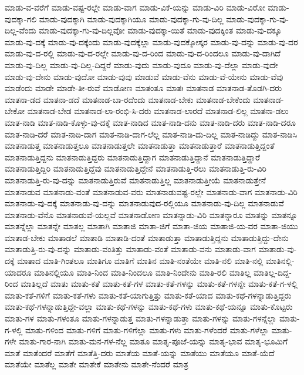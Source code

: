 ಮಾಡು-ವ-ವರೆಗೆ
ಮಾಡು-ವಷ್ಟ-ರಲ್ಲೇ
ಮಾಡು-ವಾಗ
ಮಾಡು-ವಿಕೆ-ಯನ್ನು
ಮಾಡು-ವಿರಿ
ಮಾಡು-ವಿರೋ
ಮಾಡು-ವುದಕ್ಕಾ-ಗಲಿ
ಮಾಡು-ವುದಕ್ಕಾಗಿ
ಮಾಡು-ವುದಕ್ಕಾಗಿಯೂ
ಮಾಡು-ವುದಕ್ಕಾ-ಗು-ವು-ದಿಲ್ಲ
ಮಾಡು-ವುದಕ್ಕಾ-ಗು-ವು-ದಿಲ್ಲ-ವೆಂದು
ಮಾಡು-ವುದಕ್ಕಾ-ಗು-ವು-ದಿಲ್ಲವೋ
ಮಾಡು-ವುದಕ್ಕಾ-ಯಿತೆ
ಮಾಡು-ವುದಕ್ಕಿಂತ
ಮಾಡು-ವು-ದಕ್ಕೂ
ಮಾಡು-ವು-ದಕ್ಕೆ
ಮಾಡು-ವು-ದಕ್ಕೆಂದು
ಮಾಡು-ವುದಕ್ಕೆಲ್ಲಾ
ಮಾಡು-ವುದಕ್ಕೋಸ್ಕರ
ಮಾಡು-ವು-ದನ್ನು
ಮಾಡು-ವು-ದರ
ಮಾಡು-ವು-ದ-ರಲ್ಲಿ
ಮಾಡು-ವು-ದ-ರಲ್ಲೇ
ಮಾಡು-ವು-ದ-ರಿಂದ
ಮಾಡು-ವು-ದ-ರಿಂದಲೂ
ಮಾಡು-ವು-ದಾಗಿದೆ
ಮಾಡು-ವು-ದಿಲ್ಲ
ಮಾಡು-ವು-ದಿಲ್ಲ-ದಿದ್ದರೆ
ಮಾಡು-ವುದು
ಮಾಡು-ವುದೂ
ಮಾಡು-ವು-ದೆಲ್ಲಾ
ಮಾಡು-ವುದೇ
ಮಾಡು-ವು-ದೇನು
ಮಾಡು-ವುದೋ
ಮಾಡು-ವುವು
ಮಾಡುವೆ
ಮಾಡು-ವೆನು
ಮಾಡು-ವೆ-ಯೇನು
ಮಾಡು-ವೆವು
ಮಾಡೆಂದು
ಮಾಡೇ
ಮಾಡೇ-ತೀ-ರುವೆ
ಮಾಡೋಣ
ಮಾತಂತೂ
ಮಾತಃ
ಮಾತನಾಡ
ಮಾತನಾಡ-ತೊಡಗಿ-ದರು
ಮಾತನಾ-ಡದ
ಮಾತನಾ-ಡದೆ
ಮಾತನಾಡ-ಬಾ-ರದೆಂದು
ಮಾತನಾಡ-ಬೇಕು
ಮಾತನಾಡ-ಬೇಕೆಂದು
ಮಾತನಾಡ-ಬೇಕೋ
ಮಾತನಾಡ-ಬೇಡ
ಮಾತನಾಡ-ಲಾ-ರಂಭಿ-ಸಿ-ದರು
ಮಾತನಾಡ-ಲಾರದೆ
ಮಾತನಾಡ-ಲಿಲ್ಲ
ಮಾತನಾ-ಡಲು
ಮಾತ-ನಾಡಿ
ಮಾತ-ನಾಡಿ-ಕೊಳ್ಳು-ವು-ದಕ್ಕೆ
ಮಾತ-ನಾಡಿದ
ಮಾತ-ನಾಡಿ-ದನು
ಮಾತ-ನಾಡಿ-ದರು
ಮಾತ-ನಾಡಿ-ದರೂ
ಮಾತ-ನಾಡಿ-ದರೆ
ಮಾತ-ನಾಡಿ-ದಾಗ
ಮಾತ-ನಾಡಿ-ದಾಗ-ಲೆಲ್ಲ
ಮಾತ-ನಾಡಿ-ದು-ದಿಲ್ಲ
ಮಾತ-ನಾಡಿದ್ದು
ಮಾತ-ನಾಡಿಸಿ
ಮಾತನಾಡುತ್ತ
ಮಾತನಾಡುತ್ತಲೂ
ಮಾತನಾಡುತ್ತಲೇ
ಮಾತನಾಡುತ್ತಾ
ಮಾತನಾಡುತ್ತಾರೆ
ಮಾತನಾಡುತ್ತಿದ್ದಂತೆ
ಮಾತನಾಡುತ್ತಿದ್ದನು
ಮಾತನಾಡುತ್ತಿದ್ದರು
ಮಾತನಾಡುತ್ತಿದ್ದಾಗ
ಮಾತನಾಡುತ್ತಿದ್ದಾನೆ
ಮಾತನಾಡುತ್ತಿದ್ದಾರೆ
ಮಾತನಾಡುತ್ತಿದ್ದಿರಿ
ಮಾತನಾಡುತ್ತಿದ್ದೆವು
ಮಾತನಾಡುತ್ತಿದ್ದೇನೆ
ಮಾತನಾಡುತ್ತಿ-ರಲು
ಮಾತನಾಡುತ್ತಿ-ರು-ವಿರಿ
ಮಾತನಾಡುತ್ತಿ-ರು-ವು-ದನ್ನು
ಮಾತನಾಡುತ್ತಿರುವೆ
ಮಾತನಾಡುತ್ತಿಲ್ಲ
ಮಾತನಾಡುತ್ತೀಯೆ
ಮಾತನಾಡುತ್ತೇನೆ
ಮಾತನಾಡುವ
ಮಾತನಾಡು-ವಂತೆ
ಮಾತನಾಡುವ-ವರು
ಮಾತನಾಡುವಷ್ಟ-ರಲ್ಲೇ
ಮಾತನಾಡು-ವಾಗ
ಮಾತನಾಡು-ವಿರಿ
ಮಾತನಾಡು-ವು-ದಕ್ಕೆ
ಮಾತನಾಡು-ವು-ದನ್ನು
ಮಾತನಾಡುವುದ-ರಲ್ಲಿಯೂ
ಮಾತನಾಡು-ವು-ದಿಲ್ಲ
ಮಾತನಾಡುವೆ
ಮಾತನಾಡು-ವೆನೊ
ಮಾತನಾಡುವೆ-ಯಲ್ಲವೆ
ಮಾತನಾಡೋಣ
ಮಾತನ್ನಾಡು-ವಿರಿ
ಮಾತನ್ನಾರೂ
ಮಾತನ್ನು
ಮಾತನ್ನೂ
ಮಾತನ್ನೆಲ್ಲಾ
ಮಾತನ್ನೇ
ಮಾತಲ್ಲ
ಮಾತಾಗಿ
ಮಾತಾಜಿ
ಮಾತಾ-ಜಿಗೆ
ಮಾತಾ-ಜಿಯ
ಮಾತಾಜಿ-ಯ-ವರ
ಮಾತಾ-ಜಿಯು
ಮಾತಾಡ-ಬೇಕು
ಮಾತಾಡಲೆ
ಮಾತಾಡಿ
ಮಾತಾಡಿ-ದಂತೆ
ಮಾತಾಡುತ್ತಾ
ಮಾತಾಡುತ್ತಿದ್ದನು
ಮಾತಾಡುತ್ತಿದ್ದು-ದೇನು
ಮಾತಾಡುತ್ತಿ-ರು-ವು-ದನ್ನು
ಮಾತಾಡು-ವಂತಿತ್ತು
ಮಾತಾಡು-ವಂತೆ
ಮಾತಾಡು-ವನು
ಮಾತಾಡು-ವಾಗ
ಮಾತಾಡು-ವು-ದಕ್ಕೆ
ಮಾತಾದ
ಮಾತಿ-ಗಿಂತಲೂ
ಮಾತಿಗೂ
ಮಾತಿಗೆ
ಮಾತಿನ
ಮಾತಿ-ನಂತೆಯೇ
ಮಾತಿ-ನಲಿ
ಮಾತಿ-ನಲ್ಲಿ
ಮಾತಿನಲ್ಲಿ-ಯಾದರೂ
ಮಾತಿನಲ್ಲಿಯೂ
ಮಾತಿ-ನಿಂದ
ಮಾತಿ-ನಿಂದಲೂ
ಮಾತಿ-ನಿಂದೇನು
ಮಾತಿ-ರಲಿ
ಮಾತಿಲ್ಲ
ಮಾತಿಲ್ಲ-ದಿದ್ದ-ರಿಂದ
ಮಾತಿಲ್ಲದೆ
ಮಾತು
ಮಾತು-ಕತೆ
ಮಾತು-ಕತೆ-ಗಳ
ಮಾತು-ಕತೆ-ಗಳನ್ನು
ಮಾತು-ಕತೆ-ಗಳನ್ನೇ
ಮಾತು-ಕತೆ-ಗ-ಳಲ್ಲಿ
ಮಾತು-ಕತೆ-ಗಳಿಗೆ
ಮಾತು-ಕತೆ-ಗಳು
ಮಾತು-ಕತೆ-ಯಾಗುತ್ತಿತ್ತು
ಮಾತು-ಕತೆ-ಯಾದ
ಮಾತು-ಕಥೆ-ಗಳನ್ನಾಡುತ್ತಿದ್ದರು
ಮಾತು-ಕಥೆ-ಗಳನ್ನಾಡುತ್ತಿದ್ದೇ-ವಲ್ಲಾ
ಮಾತು-ಕಥೆ-ಗಳನ್ನು
ಮಾತು-ಕಥೆ-ಗಳು
ಮಾತು-ಕಥೆ-ಯನ್ನೂ
ಮಾತು-ಕೊಟ್ಟರು
ಮಾತು-ಗಳ
ಮಾತು-ಗಳಂತೂ
ಮಾತು-ಗಳನ್ನಾಡುತ್ತ
ಮಾತು-ಗಳನ್ನಾಡುತ್ತಾ
ಮಾತು-ಗಳನ್ನು
ಮಾತು-ಗಳನ್ನೆಲ್ಲಾ
ಮಾತು-ಗ-ಳಲ್ಲಿ
ಮಾತು-ಗಳಿಂದ
ಮಾತು-ಗಳಿಗೆ
ಮಾತು-ಗಳಿಗೆಲ್ಲಾ
ಮಾತು-ಗಳು
ಮಾತು-ಗಳೆಂದರೆ
ಮಾತು-ಗಳೆಲ್ಲಾ
ಮಾತು-ಗಳೇ
ಮಾತು-ಗಾರ-ನಾಗಿ
ಮಾತು-ಮನ-ಗಳ-ನೆಲ್ಲ
ಮಾತೂ
ಮಾತೃ-ಪೂಜೆ-ಯನ್ನು
ಮಾತೃ-ಭಾವ
ಮಾತೃ-ಭೂಮಿಗೆ
ಮಾತೆ
ಮಾತೆಂದರೆ
ಮಾತೆಗೆ
ಮಾತೆತ್ತಿ-ದರು
ಮಾತೆಯ
ಮಾತೆ-ಯನ್ನು
ಮಾತೆಯು
ಮಾತೆಯೂ
ಮಾತೆ-ಯೆದೆ
ಮಾತೆಯೇ
ಮಾತೆಲ್ಲ
ಮಾತೇ
ಮಾತೇಕೆ
ಮಾತೇನು
ಮಾತೇ-ನೆಂದರೆ
ಮಾತ್ರ
